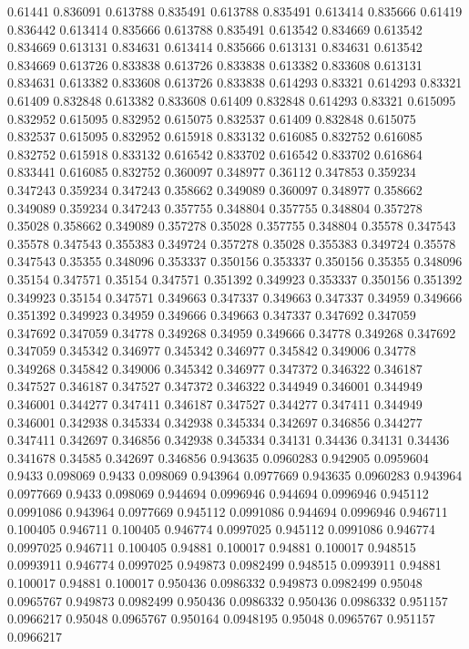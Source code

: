 0.61441 0.836091
0.613788 0.835491
0.613788 0.835491
0.613414 0.835666
0.61419 0.836442
0.613414 0.835666
0.613788 0.835491
0.613542 0.834669
0.613542 0.834669
0.613131 0.834631
0.613414 0.835666
0.613131 0.834631
0.613542 0.834669
0.613726 0.833838
0.613726 0.833838
0.613382 0.833608
0.613131 0.834631
0.613382 0.833608
0.613726 0.833838
0.614293 0.83321
0.614293 0.83321
0.61409 0.832848
0.613382 0.833608
0.61409 0.832848
0.614293 0.83321
0.615095 0.832952
0.615095 0.832952
0.615075 0.832537
0.61409 0.832848
0.615075 0.832537
0.615095 0.832952
0.615918 0.833132
0.616085 0.832752
0.616085 0.832752
0.615918 0.833132
0.616542 0.833702
0.616542 0.833702
0.616864 0.833441
0.616085 0.832752
0.360097 0.348977
0.36112 0.347853
0.359234 0.347243
0.359234 0.347243
0.358662 0.349089
0.360097 0.348977
0.358662 0.349089
0.359234 0.347243
0.357755 0.348804
0.357755 0.348804
0.357278 0.35028
0.358662 0.349089
0.357278 0.35028
0.357755 0.348804
0.35578 0.347543
0.35578 0.347543
0.355383 0.349724
0.357278 0.35028
0.355383 0.349724
0.35578 0.347543
0.35355 0.348096
0.353337 0.350156
0.353337 0.350156
0.35355 0.348096
0.35154 0.347571
0.35154 0.347571
0.351392 0.349923
0.353337 0.350156
0.351392 0.349923
0.35154 0.347571
0.349663 0.347337
0.349663 0.347337
0.34959 0.349666
0.351392 0.349923
0.34959 0.349666
0.349663 0.347337
0.347692 0.347059
0.347692 0.347059
0.34778 0.349268
0.34959 0.349666
0.34778 0.349268
0.347692 0.347059
0.345342 0.346977
0.345342 0.346977
0.345842 0.349006
0.34778 0.349268
0.345842 0.349006
0.345342 0.346977
0.347372 0.346322
0.346187 0.347527
0.346187 0.347527
0.347372 0.346322
0.344949 0.346001
0.344949 0.346001
0.344277 0.347411
0.346187 0.347527
0.344277 0.347411
0.344949 0.346001
0.342938 0.345334
0.342938 0.345334
0.342697 0.346856
0.344277 0.347411
0.342697 0.346856
0.342938 0.345334
0.34131 0.34436
0.34131 0.34436
0.341678 0.34585
0.342697 0.346856
0.943635 0.0960283
0.942905 0.0959604
0.9433 0.098069
0.9433 0.098069
0.943964 0.0977669
0.943635 0.0960283
0.943964 0.0977669
0.9433 0.098069
0.944694 0.0996946
0.944694 0.0996946
0.945112 0.0991086
0.943964 0.0977669
0.945112 0.0991086
0.944694 0.0996946
0.946711 0.100405
0.946711 0.100405
0.946774 0.0997025
0.945112 0.0991086
0.946774 0.0997025
0.946711 0.100405
0.94881 0.100017
0.94881 0.100017
0.948515 0.0993911
0.946774 0.0997025
0.949873 0.0982499
0.948515 0.0993911
0.94881 0.100017
0.94881 0.100017
0.950436 0.0986332
0.949873 0.0982499
0.95048 0.0965767
0.949873 0.0982499
0.950436 0.0986332
0.950436 0.0986332
0.951157 0.0966217
0.95048 0.0965767
0.950164 0.0948195
0.95048 0.0965767
0.951157 0.0966217
